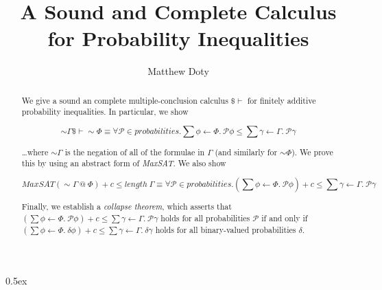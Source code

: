 \documentclass[11pt,a4paper]{report}
\begin{document}
\title{A Sound and Complete Calculus for Probability Inequalities}
\author{Matthew Doty}

\maketitle

\begin{abstract}
  We give a sound an complete multiple-conclusion calculus
  \(\$\vdash\) for finitely additive probability inequalities. In
  particular, we show

  $$\mathbf{\sim} \Gamma \$\vdash \mathbf{\sim} \Phi \equiv \forall \mathcal{P} \in probabilities. \sum \phi \leftarrow \Phi.\ \mathcal{P} \phi \leq \sum \gamma \leftarrow \Gamma.\ \mathcal{P} \gamma $$

  \ldots where $\sim \Gamma$ is the negation of all of the formulae in
  $\Gamma$ (and similarly for $\sim\Phi$). We prove this by using an
  abstract form of {\em MaxSAT}. We also show

  $$MaxSAT (\mathbf{\sim} \Gamma\ @\ \Phi) + c\leq length\ \Gamma \equiv \forall \mathcal{P} \in probabilities. \left(\sum \phi \leftarrow \Phi.\ \mathcal{P} \phi\right) + c \leq \sum \gamma \leftarrow \Gamma.\ \mathcal{P} \gamma $$

  Finally, we establish a {\em collapse theorem}, which asserts that
  $\left(\sum \phi \leftarrow \Phi.\ \mathcal{P} \phi\right) + c \leq
  \sum \gamma \leftarrow \Gamma.\ \mathcal{P} \gamma$ holds for all
  probabilities $\mathcal{P}$ if and only if
  $\left(\sum \phi \leftarrow \Phi.\ \delta \phi\right) + c \leq \sum
  \gamma \leftarrow \Gamma.\ \delta \gamma$ holds for all
  binary-valued probabilities $\delta$.
\end{abstract}

\tableofcontents

\newpage

\parindent 0pt\parskip 0.5ex





\end{document}
